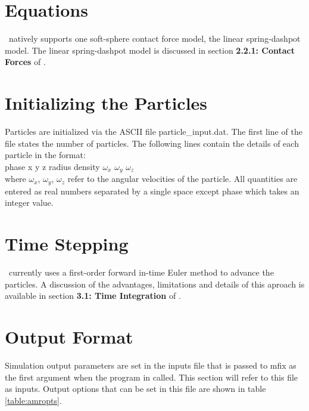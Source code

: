 \section{Equations}

\mfix\ natively supports one soft-sphere contact force model, the linear
spring-dashpot model. The linear spring-dashpot model is discussed in
section {\bf 2.2.1: Contact Forces} of \demdoc.


\section{Initializing the Particles}

Particles are initialized via the ASCII file {\sf particle\_input.dat}. The
first line of the file states the number of particles. The following lines
contain the details of each particle in the format: \\

{\sf phase x y z radius density $\omega_x$ $\omega_y$ $\omega_z$}  \\

\noindent
where {\sf $\omega_x$, $\omega_y$, $\omega_z$} refer to the angular velocities
 of the particle. All quantities are entered as real numbers separated by a
single space except {\sf phase} which takes an integer value.


%



\section{Time Stepping}

\mfix\ currently uses a first-order forward in-time Euler method to advance
the particles. A discussion of the advantages, limitations and details of this
aproach is available in section {\bf 3.1: Time Integration} of \demdoc.

\section{Output Format}

Simulation output parameters are set in the inputs file that is passed to mfix
as the first argument when the program in called. This section will refer
to this file as {\sf inputs}. Output options that can be set in this file are
shown in table \ref{table:amropts}.

